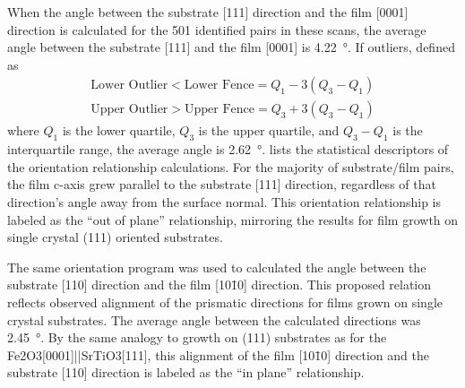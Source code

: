\documentclass[12pt,%
              twoside,
               letterpaper]{uiothesis}
\begin{document}
%	
%		
%		
%		
%		
%		
%		
%		
%		
When the angle between the substrate [111] direction and the film [0001] direction is
calculated for the 501 identified pairs in these scans, the average angle between the
substrate [111] and the film [0001] is \SI{4.22}{\degree}. If outliers, defined as
\begin{gather}
\text{Lower Outlier} < \text{Lower Fence} = Q_{1}-3(Q_{3}-Q_{1})\\
\text{Upper Outlier} > \text{Upper Fence}=  Q_{3}+3(Q_{3}-Q_{1})
\end{gather}
where $Q_{1}$ is the lower quartile, $Q_{3}$ is the upper quartile, and $Q_{3}-Q_{1}$ is
the interquartile range, the average angle is \SI{2.62}{\degree}.
 lists the statistical descriptors of the orientation
relationship calculations. For the majority of substrate/film pairs, the film c-axis grew
parallel to the substrate [111] direction, regardless of that direction's angle away from
the surface normal. This orientation relationship is labeled as the ``out of plane''
relationship, mirroring the results for film growth on single crystal (111) oriented \sto
substrates.

The same orientation program was used to calculated the angle between the substrate [110]
direction and the film [10\={1}0] direction. This proposed relation reflects observed
alignment of the prismatic directions for films grown on single crystal substrates. The
average angle between the calculated directions was \SI{2.45}{\degree}. By the same
analogy to growth on \sto (111) substrates as for the Fe2O3[0001]||SrTiO3[111],
this alignment of the film [10\={1}0] direction and the substrate [110] direction is
labeled as the ``in plane'' relationship.
\end{document}
